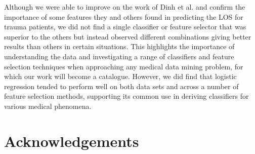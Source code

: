 \documentclass{article}
\begin{document}
Although we were able to improve on the work of Dinh et al. \cite{Dinh2013a}
and confirm the
importance of some features they and others found in predicting the LOS for
trauma patients, we did not find a single classifier or feature selector
that was superior to the others but instead observed different combinations
giving better results than others in certain situations. This highlights the
importance of understanding the data and investigating a range of classifiers
and feature selection techniques when approaching any medical data mining
problem, for which our work will become a catalogue.
However, we did find that logistic regression tended to perform well
on both data sets and across a number of feature selection methods, supporting
its common use in deriving classifiers for various medical phenomena.

\section*{Acknowledgements}

{
  
}
\end{document}
